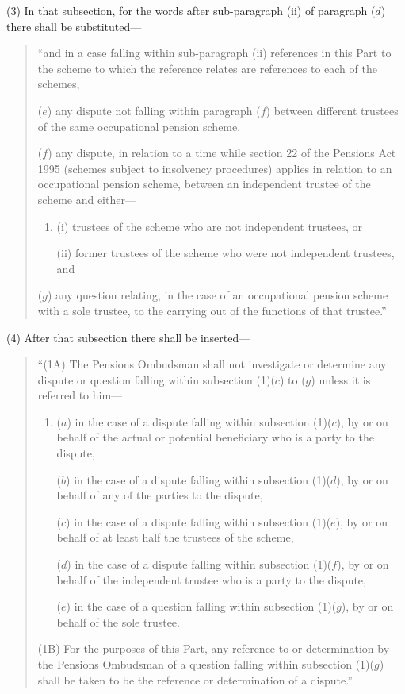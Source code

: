 \documentclass[12pt,a4paper]{article}
\begin{document}
(3) In that subsection, for the words after sub-paragraph (ii)  of paragraph ($d$)  there shall be substituted—
\begin{quotation}
“and in a case falling within sub-paragraph (ii)  references in this Part to the scheme to which the reference relates are references to each of the schemes,

($e$) any dispute not falling within paragraph ($f$)  between different trustees of the same occupational pension scheme,

($f$) any dispute, in relation to a time while section 22 of the Pensions Act 1995 (schemes subject to insolvency procedures) applies in relation to an occupational pension scheme, between an independent trustee of the scheme and either—
\begin{enumerate}\item[]
\begin{sloppypar}
(i) trustees of the scheme who are not independent trustees, or
\end{sloppypar}

(ii) former trustees of the scheme who were not independent trustees, and
\end{enumerate}

($g$) any question relating, in the case of an occupational pension scheme with a sole trustee, to the carrying out of the functions of that trustee.”
\end{quotation}

(4) After that subsection there shall be inserted—
\begin{quotation}
“(1A) The Pensions Ombudsman shall not investigate or determine any dispute or question falling within subsection (1)($c$)  to ($g$)  unless it is referred to him—
\begin{enumerate}\item[]
($a$) in the case of a dispute falling within subsection (1)($c$), by or on behalf of the actual or potential beneficiary who is a party to the dispute,

($b$) in the case of a dispute falling within subsection (1)($d$), by or on behalf of any of the parties to the dispute,

($c$) in the case of a dispute falling within subsection (1)($e$), by or on behalf of at least half the trustees of the scheme,

($d$) in the case of a dispute falling within subsection (1)($f$), by or on behalf of the independent trustee who is a party to the dispute,

($e$) in the case of a question falling within subsection (1)($g$), by or on behalf of the sole trustee.
\end{enumerate}

(1B) For the purposes of this Part, any reference to or determination by the Pensions Ombudsman of a question falling within subsection (1)($g$)  shall be taken to be the reference or determination of a dispute.”
\end{quotation}
\end{document}
